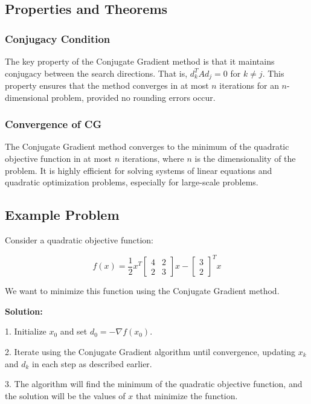 \documentclass[a4paper]{article}
\begin{document}
\subsection{Properties and Theorems}

\subsubsection{Conjugacy Condition}

The key property of the Conjugate Gradient method is that it maintains conjugacy between the search directions. That is, $d_k^T A d_j = 0$ for $k \neq j$. This property ensures that the method converges in at most $n$ iterations for an $n$-dimensional problem, provided no rounding errors occur.

\subsubsection{Convergence of CG}

The Conjugate Gradient method converges to the minimum of the quadratic objective function in at most $n$ iterations, where $n$ is the dimensionality of the problem. It is highly efficient for solving systems of linear equations and quadratic optimization problems, especially for large-scale problems.

\subsection{Example Problem}

Consider a quadratic objective function:

\[
f(x) = \frac{1}{2}x^T
\begin{bmatrix}
4 & 2 \\
2 & 3
\end{bmatrix}
x - \begin{bmatrix}
3 \\
2
\end{bmatrix}^Tx
\]

We want to minimize this function using the Conjugate Gradient method.

\textbf{Solution:}

1. Initialize $x_0$ and set $d_0 = -\nabla f(x_0)$.

2. Iterate using the Conjugate Gradient algorithm until convergence, updating $x_k$ and $d_k$ in each step as described earlier.

3. The algorithm will find the minimum of the quadratic objective function, and the solution will be the values of $x$ that minimize the function.
\end{document}
